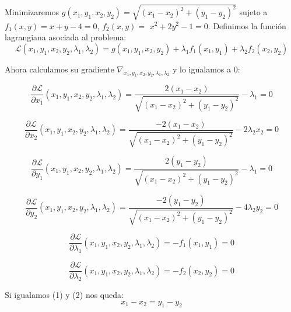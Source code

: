 \documentclass[11pt,leqno]{article}
\theoremstyle{definition}
\begin{document}
\begin{solucion} 

Minimizaremos $g(x_1, y_1, x_2, y_2) = \sqrt{(x_1-x_2)^2+(y_1-y_2)^2}$ sujeto a $f_1(x,y) = x + y - 4 = 0$, $f_2(x,y) =$ $x^2 + 2y^2 - 1 = 0$. Definimos la función lagrangiana asociada al problema:
 \[ \mathcal{L}(x_1, y_1, x_2, y_2, \lambda_1, \lambda_2) = g(x_1, y_1, x_2, y_2) + \lambda_1 f_1(x_1,y_1) + \lambda_2 f_2(x_2,y_2) \]
 
 Ahora calculamos su gradiente $\nabla_{x_1, y_1, x_2, y_2, \lambda_1, \lambda_2}$ y lo igualamos a $0$:
 
	\begin{equation}
 		\frac{\partial \mathcal{L}}{\partial x_1}(x_1, y_1, x_2, y_2, \lambda_1, \lambda_2) =
 			\frac{2(x_1-x_2)}{\sqrt{(x_1-x_2)^2+(y_1-y_2)^2}} - \lambda_1 = 0
	\end{equation}  

	\begin{equation}
 		\frac{\partial \mathcal{L}}{\partial x_2}(x_1, y_1, x_2, y_2, \lambda_1, \lambda_2) =
 			\frac{-2(x_1-x_2)}{\sqrt{(x_1-x_2)^2+(y_1-y_2)^2}} - 2\lambda_2 x_2 = 0
	\end{equation}  
	
	\begin{equation}
 		\frac{\partial \mathcal{L}}{\partial y_1}(x_1, y_1, x_2, y_2, \lambda_1, \lambda_2) =
 			\frac{2(y_1-y_2)}{\sqrt{(x_1-x_2)^2+(y_1-y_2)^2}} - \lambda_1 = 0
	\end{equation}
	
	\begin{equation}
 		\frac{\partial \mathcal{L}}{\partial y_2}(x_1, y_1, x_2, y_2, \lambda_1, \lambda_2) =
 			\frac{-2(y_1-y_2)}{\sqrt{(x_1-x_2)^2+(y_1-y_2)^2}} - 4\lambda_2 y_2 = 0
	\end{equation}  

	\begin{equation}
 		\frac{\partial \mathcal{L}}{\partial \lambda_1}(x_1, y_1, x_2, y_2, \lambda_1, \lambda_2) =
 			-f_1(x_1,y_1) = 0
	\end{equation} 
	
	\begin{equation}
 		\frac{\partial \mathcal{L}}{\partial \lambda_2}(x_1, y_1, x_2, y_2, \lambda_1, \lambda_2) =
 			-f_2(x_2,y_2) = 0
	\end{equation} 
	
	Si igualamos (1) y (2) nos queda:
	\begin{equation}
		x_1-x_2=y_1-y_2
	\end{equation}
	

\end{solucion}
\end{document}

